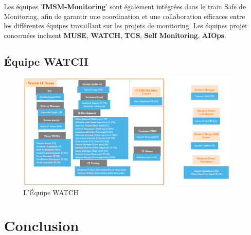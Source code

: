 \medskip

Les équipes '\textbf{IMSM-Monitoring}' sont également intégrées dans le train Safe de Monitoring, afin de garantir une coordination et une collaboration efficaces entre les différentes équipes travaillant sur les projets de monitoring.
Les équipes projet concernées incluent \textbf{MUSE}, \textbf{WATCH}, \textbf{TCS}, \textbf{Self Monitoring}, \textbf{AIOps}.

\clearpage

\subsection{Équipe WATCH}

\begin{figure}[h]
    \centering
    \includegraphics[width=1\textwidth]{images/watch_team.png}
    \caption{L'Équipe WATCH}
    \label{fig:watch_team}
\end{figure}

\section{Conclusion}